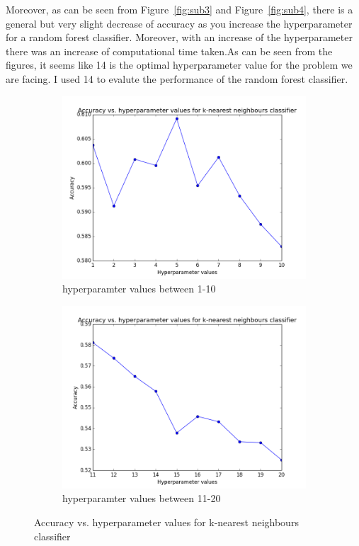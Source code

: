 \documentclass{article} %
\begin{document}
Moreover, as can be seen from Figure~\ref{fig:sub3} and Figure~\ref{fig:sub4}, there is a general but very slight decrease of accuracy as you increase the hyperparameter for a random forest classifier. Moreover, with an increase of the hyperparameter there was an increase of computational time taken.As can be seen from the figures, it seems like 14 is the optimal hyperparameter value for the problem we are facing. I used 14 to evalute the performance of the random forest classifier. 

\begin{figure}[H]
\centering
\begin{subfigure}{.4\textwidth}
  \centering
  \includegraphics[width=.9\linewidth]{hyperparameter_knn_1_10.png}
  \caption{hyperparamter values between 1-10}
  \label{fig:sub1}
\end{subfigure}%
\begin{subfigure}{.4\textwidth}
  \centering
  \includegraphics[width=.9\linewidth]{hyperparameter_knn_11_20.png}
  \caption{hyperparamter values between 11-20}
  \label{fig:sub2}
\end{subfigure}
\caption{Accuracy vs. hyperparameter values for k-nearest neighbours classifier}
\label{fig:test1}
\end{figure}
\end{document}
